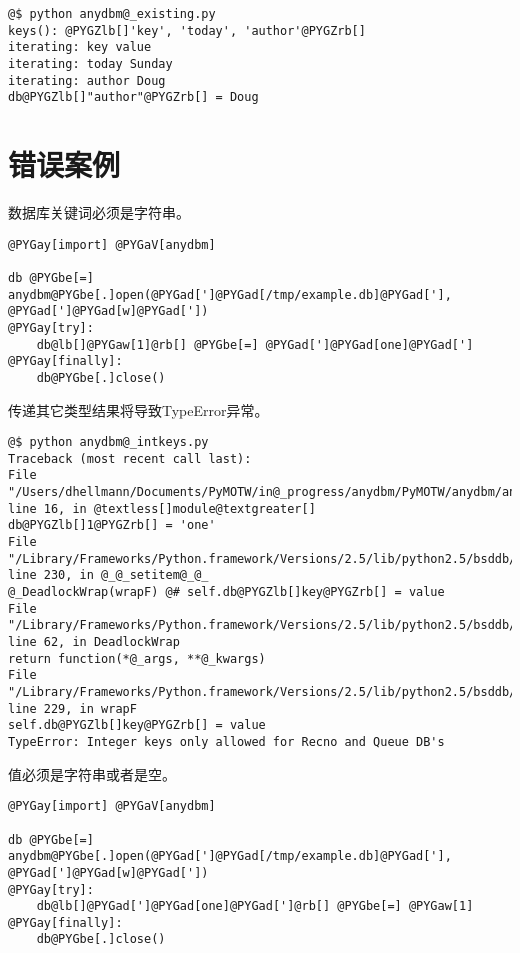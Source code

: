 \documentclass[a4paper,10pt,english]{manual}
\begin{document}
\begin{Verbatim}[commandchars=@\[\]]
@$ python anydbm@_existing.py
keys(): @PYGZlb[]'key', 'today', 'author'@PYGZrb[]
iterating: key value
iterating: today Sunday
iterating: author Doug
db@PYGZlb[]"author"@PYGZrb[] = Doug
\end{Verbatim}


\section{错误案例}

数据库关键词必须是字符串。

\begin{Verbatim}[commandchars=@\[\]]
@PYGay[import] @PYGaV[anydbm]

db @PYGbe[=] anydbm@PYGbe[.]open(@PYGad[']@PYGad[/tmp/example.db]@PYGad['], @PYGad[']@PYGad[w]@PYGad['])
@PYGay[try]:
    db@lb[]@PYGaw[1]@rb[] @PYGbe[=] @PYGad[']@PYGad[one]@PYGad[']
@PYGay[finally]:
    db@PYGbe[.]close()
\end{Verbatim}

传递其它类型结果将导致TypeError异常。

\begin{Verbatim}[commandchars=@\[\]]
@$ python anydbm@_intkeys.py
Traceback (most recent call last):
File "/Users/dhellmann/Documents/PyMOTW/in@_progress/anydbm/PyMOTW/anydbm/anydbm@_intkeys.py", line 16, in @textless[]module@textgreater[]
db@PYGZlb[]1@PYGZrb[] = 'one'
File "/Library/Frameworks/Python.framework/Versions/2.5/lib/python2.5/bsddb/@_@_init@_@_.py", line 230, in @_@_setitem@_@_
@_DeadlockWrap(wrapF) @# self.db@PYGZlb[]key@PYGZrb[] = value
File "/Library/Frameworks/Python.framework/Versions/2.5/lib/python2.5/bsddb/dbutils.py", line 62, in DeadlockWrap
return function(*@_args, **@_kwargs)
File "/Library/Frameworks/Python.framework/Versions/2.5/lib/python2.5/bsddb/@_@_init@_@_.py", line 229, in wrapF
self.db@PYGZlb[]key@PYGZrb[] = value
TypeError: Integer keys only allowed for Recno and Queue DB's
\end{Verbatim}

值必须是字符串或者是空。

\begin{Verbatim}[commandchars=@\[\]]
@PYGay[import] @PYGaV[anydbm]

db @PYGbe[=] anydbm@PYGbe[.]open(@PYGad[']@PYGad[/tmp/example.db]@PYGad['], @PYGad[']@PYGad[w]@PYGad['])
@PYGay[try]:
    db@lb[]@PYGad[']@PYGad[one]@PYGad[']@rb[] @PYGbe[=] @PYGaw[1]
@PYGay[finally]:
    db@PYGbe[.]close()
\end{Verbatim}
\end{document}
